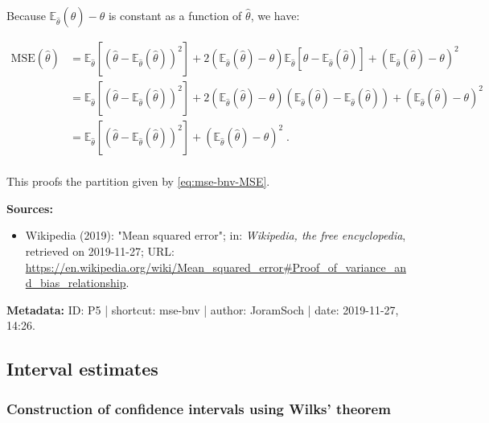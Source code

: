 \documentclass[a4paper,12pt,twoside]{book}
\begin{document}
Because $\mathbb{E}_{\hat{\theta}}(\hat{\theta}) - \theta$ is constant as a function of $\hat{\theta}$, we have:

\begin{equation} \label{eq:mse-bnv-MSE-ref2}
\begin{split}
\mathrm{MSE}(\hat{\theta}) &= \mathbb{E}_{\hat{\theta}}\left[ \left( \hat{\theta} - \mathbb{E}_{\hat{\theta}}(\hat{\theta}) \right)^2 \right] + 2  \left( \mathbb{E}_{\hat{\theta}}(\hat{\theta}) - \theta \right) \mathbb{E}_{\hat{\theta}}\left[ \hat{\theta} - \mathbb{E}_{\hat{\theta}}(\hat{\theta}) \right] + \left( \mathbb{E}_{\hat{\theta}}(\hat{\theta}) - \theta \right)^2 \\
&= \mathbb{E}_{\hat{\theta}}\left[ \left( \hat{\theta} - \mathbb{E}_{\hat{\theta}}(\hat{\theta}) \right)^2 \right] + 2  \left( \mathbb{E}_{\hat{\theta}}(\hat{\theta}) - \theta \right) \left( \mathbb{E}_{\hat{\theta}}(\hat{\theta}) - \mathbb{E}_{\hat{\theta}}(\hat{\theta}) \right) + \left( \mathbb{E}_{\hat{\theta}}(\hat{\theta}) - \theta \right)^2 \\
&= \mathbb{E}_{\hat{\theta}}\left[ \left( \hat{\theta} - \mathbb{E}_{\hat{\theta}}(\hat{\theta}) \right)^2 \right] + \left( \mathbb{E}_{\hat{\theta}}(\hat{\theta}) - \theta \right)^2 \; . \\
\end{split}
\end{equation}

This proofs the partition given by \eqref{eq:mse-bnv-MSE}.


\vspace{1em}
\textbf{Sources:}
\begin{itemize}
\item Wikipedia (2019): "Mean squared error"; in: \textit{Wikipedia, the free encyclopedia}, retrieved on 2019-11-27; URL: \url{https://en.wikipedia.org/wiki/Mean_squared_error#Proof_of_variance_and_bias_relationship}.
\end{itemize}


\vspace{1em}
\textbf{Metadata:} ID: P5 | shortcut: mse-bnv | author: JoramSoch | date: 2019-11-27, 14:26.
\vspace{1em}



\subsection{Interval estimates}

\subsubsection[\textbf{Construction of confidence intervals using Wilks' theorem}]{Construction of confidence intervals using Wilks' theorem} \label{sec:ci-wilks}
\setcounter{equation}{0}
\end{document}
